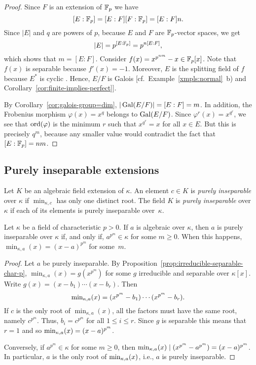 \begin{proof}
    Since $F$ is an extension of $\mathbb F_p$ we have
    $$
        [E:\mathbb F_p] = [E:F][F:\mathbb F_p] = [E:F]n.
    $$
    Since $|E|$ and $q$ are powers of $p$, because $E$ and $F$ are $\mathbb F_p$-vector spaces, we get
    $$
        |E|=p^{[E:\mathbb F_p]} = p^{n[E:F]},
    $$
    which shows that $m=[E:F]$. Consider $f(x)=x^{p^{nm}}-x\in\mathbb F_p[x]$. Note that $f(x)$ is separable because $f'(x)=-1$. Moreover, $E$ is the splitting field of $f$ because $E^*$ is cyclic \citep{LC}. Hence, $E/F$ is Galois [cf.~Example~\ref{xmpls:normal}~b) and Corollary~\ref{cor:finite-implies-perfect}].

    By Corollary~\ref{cor:galois-group=dim}, $|\operatorname{Gal}(E/F)|=[E:F]=m$. In addition, the Frobenius morphism $\varphi(x)=x^q$ belongs to $\operatorname{Gal}(E/F)$. Since $\varphi^r(x)=x^{q^r}$, we see that ${\rm ord}(\varphi)$ is the minimum $r$ such that $x^{q^r}=x$ for all $x\in E$. But this is precisely $q^m$, because any smaller value would contradict the fact that $[E:\mathbb F_p]=nm$.
    
\end{proof}
    

\subsection{Purely inseparable extensions}

\begin{defn}
    Let $K$ be an algebraic field extension of $\kappa$. An element $c \in K$ is \textsl{purely inseparable} over $\kappa$ if $\min_{\kappa, c}$ has only one distinct root. The field $K$ is \textsl{purely inseparable} over $\kappa$ if each of its elements is purely inseparable over~$\kappa$.
\end{defn}

\begin{lem}\label{lem:purely-inseparable-minimal}
    Let\/ $\kappa$ be a field of characteristic\/ $p > 0$. If\/ $a$ is algebraic over\/ $\kappa$, then\/ $a$ is purely inseparable over\/ $\kappa$ if, and only if, $a^{p^m} \in \kappa$ for some\/ $m\ge0$. When this happens, $\min_{\kappa, a}(x) = (x - a)^{p^m}$ for some\/~$m$.
\end{lem}

\begin{proof}
    Let $a$ be purely inseparable. By Proposition~\ref{prop:irreducible-separable-char-p}, $\min_{\kappa,a}(x)=g(x^{p^m})$ for some $g$ irreducible and separable over $\kappa[x]$. Write $g(x)=(x-b_1)\cdots(x-b_r)$. Then
    $$
        \operatorname{min}_{\kappa,a}(x)= (x^{p^m}-b_1)\cdots(x^{p^m}-b_r).
    $$
    If $c$ is the only root of $\min_{\kappa,a}(x)$, all the factors must have the same root, namely $c^{p^m}$. Thus, $b_i=c^{p^m}$ for all $1\le i\le r$. Since $g$ is separable this means that $r=1$ and so $\operatorname{min}_{\kappa,a}(x)=(x-a)^{p^m}$.

    Conversely, if $a^{p^m}\in\kappa$ for some $m\ge0$, then $\operatorname{min}_{\kappa,a}(x)\mid(x^{p^m}-a^{p^m})=(x-a)^{p^m}$. In particular, $a$ is the only root of $\operatorname{min}_{\kappa,a}(x)$, i.e., $a$ is purely inseparable.
    
\end{proof}

